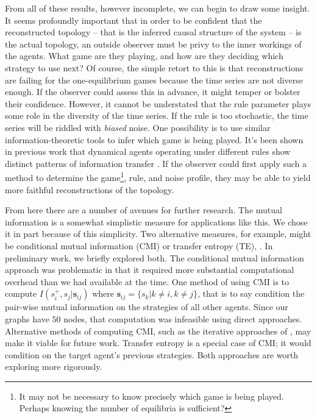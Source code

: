 \documentclass[letterpaper]{article}
\begin{document}
From all of these results, however incomplete, we can begin to draw some insight. It seems profoundly important that in order to be confident that the reconstructed topology -- that is the inferred causal structure of the system -- is the actual topology, an outside observer must be privy to the inner workings of the agents. What game are they playing, and how are they deciding which strategy to use next? Of course, the simple retort to this is that reconstructions are failing for the one-equilibrium games because the time series are not diverse enough. If the observer could assess this in advance, it might temper or bolster their confidence. However, it cannot be understated that the rule parameter plays some role in the diversity of the time series. If the rule is too stochastic, the time series will be riddled with \textit{biased} noise. One possibility is to use similar information-theoretic tools to infer which game is being played. It's been shown in previous work that dynamical agents operating under different rules show distinct patterns of information transfer \citep{Valentini2018-qb}. If the observer could first apply such a method to determine the game\footnote{It may not be necessary to know precisely which game is being played. Perhaps knowing the number of equilibria is sufficient?}, rule, and noise profile, they may be able to yield more faithful reconstructions of the topology.

From here there are a number of avenues for further research. The mutual information is a somewhat simplistic measure for applications like this. We chose it in part because of this simplicity. Two alternative measures, for example, might be conditional mutual information (CMI) or transfer entropy (TE), \citep{Schreiber2000-ir}. In preliminary work, we briefly explored both. The conditional mutual information approach was problematic in that it required more substantial computational overhead than we had available at the time. One method of using CMI is to compute $I(s_i^+,s_j|\bm{s}_{ij})$ where $\bm{s}_{ij} = \{s_k | k \ne i, k \ne j\}$, that is to say condition the pair-wise mutual information on the strategies of all other agents. Since our graphs have $50$ nodes, that computation was infeasible using direct approaches. Alternative methods of computing CMI, such as the iterative approaches of \citep{Lizier2012-nf,Sun2015-xs}, may make it viable for future work. Transfer entropy is a special case of CMI; it would condition on the target agent's previous strategies. Both approaches are worth exploring more rigorously.
\end{document}
